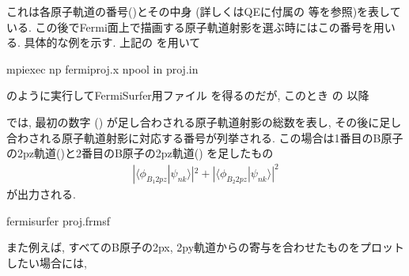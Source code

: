 \documentclass[letterpaper,10pt,dvipdfmx,openany]{sphinxmanual}
\begin{document}
\sphinxAtStartPar
これは各原子軌道の番号()とその中身
(詳しくはQEに付属の  等を参照)を表している.
この後でFermi面上で描画する原子軌道射影を選ぶ時にはこの番号を用いる.
具体的な例を示す. 上記の  を用いて

\begin{sphinxVerbatim}[commandchars=\\\{\}]
\PYGZdl{} mpiexec \PYGZhy{}np  fermi\PYGZus{}proj.x \PYGZhy{}npool  \PYGZhy{}in proj.in
\end{sphinxVerbatim}

\sphinxAtStartPar
のように実行してFermiSurfer用ファイル  を得るのだが,
このとき  の \sphinxcode{\sphinxupquote{/}} 以降

\begin{sphinxVerbatim}[commandchars=\\\{\}]
 
\end{sphinxVerbatim}

\sphinxAtStartPar
では, 最初の数字 () が足し合わされる原子軌道射影の総数を表し,
その後に足し合わされる原子軌道射影に対応する番号が列挙される.
この場合は1番目のB原子の2pz軌道()と2番目のB原子の2pz軌道()
を足したもの
\begin{equation*}
\begin{split}|\langle \phi_{B_1 2pz} | \psi_{nk} \rangle|^2
+ |\langle \phi_{B_2 2pz} | \psi_{nk} \rangle|^2\end{split}
\end{equation*}
\sphinxAtStartPar
が出力される.

\begin{sphinxVerbatim}[commandchars=\\\{\}]
\PYGZdl{} fermisurfer proj.frmsf
\end{sphinxVerbatim}

\begin{figure}[htbp]
\centering

\noindent{}
\end{figure}

\sphinxAtStartPar
また例えば, すべてのB原子の2px, 2py軌道からの寄与を合わせたものをプロットしたい場合には,

\begin{sphinxVerbatim}[commandchars=\\\{\}]
  
   
\end{sphinxVerbatim}
\end{document}
